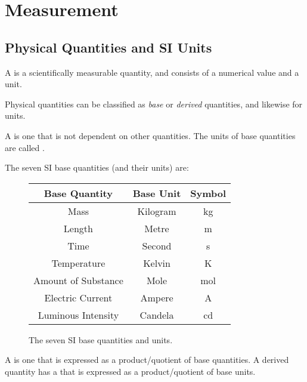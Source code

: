 \chapter{Measurement}

\section{Physical Quantities and SI Units}

\begin{definition}
    A  is a scientifically measurable quantity, and consists of a numerical value and a unit.
\end{definition}

Physical quantities can be classified as \emph{base} or \emph{derived} quantities, and likewise for units.

\begin{definition}
    A  is one that is not dependent on other quantities. The units of base quantities are called .
\end{definition}

The seven SI base quantities (and their units) are:

\begin{figure}[H]
    \centering
    \begin{tabular}{|c|c|c|}
        \hline
        \textbf{Base Quantity} & \textbf{Base Unit} & \textbf{Symbol} \\\hline\hline
        Mass & Kilogram & kg \\\hline
        Length & Metre & m \\\hline
        Time & Second & s \\\hline
        Temperature & Kelvin & K \\\hline
        Amount of Substance & Mole & mol \\\hline
        Electric Current & Ampere & A \\\hline
        Luminous Intensity & Candela & cd\\\hline
    \end{tabular}
    \caption{The seven SI base quantities and units.}
\end{figure}

\begin{definition}
    A  is one that is expressed as a product/quotient of base quantities. A derived quantity has a  that is expressed as a product/quotient of base units.
\end{definition}

